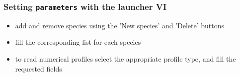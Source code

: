 \documentclass[9pt]{beamer}
\begin{document}
{
\begin{frame}[fragile]
  \frametitle{Setting {\tt parameters} with the launcher VI}

\vspace{5.25cm}

\begin{block}{}
\begin{itemize}
\item add and remove species using the 'New species' and 'Delete' buttons
\item fill the corresponding list for each species
\item to read numerical profiles select the appropriate profile type, and fill the requested fields
\end{itemize}
\end{block}

\end{frame}
}

\end{document}
